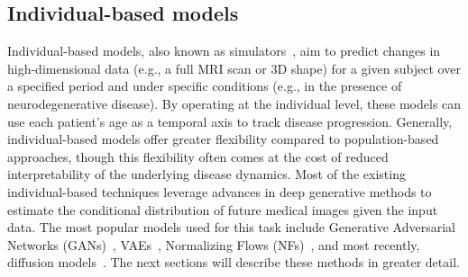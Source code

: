 \subsection{Individual-based models}
Individual-based models, also known as simulators~\citep{ravi2022degenerative}, aim to predict changes in high-dimensional data (e.g., a full MRI scan or 3D shape) for a given subject over a specified period and under specific conditions (e.g., in the presence of neurodegenerative disease). By operating at the individual level, these models can use each patient’s age as a temporal axis to track disease progression. Generally, individual-based models offer greater flexibility compared to population-based approaches, though this flexibility often comes at the cost of reduced interpretability of the underlying disease dynamics. Most of the existing individual-based techniques leverage advances in deep generative methods to estimate the conditional distribution of future medical images given the input data. The most popular models used for this task include Generative Adversarial Networks (GANs)~\citep{goodfellow2020generative}, VAEs~\citep{kingma2013auto}, Normalizing Flows (NFs)~\citep{papamakarios2021normalizing}, and most recently, diffusion models~\citep{ho2020denoising}. The next sections will describe these methods in greater detail.


